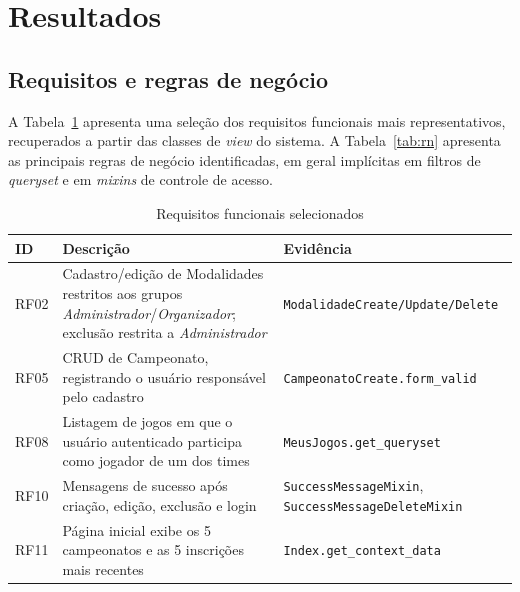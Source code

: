 \documentclass[12pt]{article}
\begin{document}
\section{Resultados}
\label{sec:resultados}

\subsection{Requisitos e regras de negócio}

A Tabela~\ref{tab:rf} apresenta uma seleção dos requisitos funcionais mais
representativos, recuperados a partir das classes de \emph{view} do sistema.
A Tabela~\ref{tab:rn} apresenta as principais regras de negócio
identificadas, em geral implícitas em filtros de \emph{queryset} e em
\emph{mixins} de controle de acesso.

\begin{table}[ht]
\centering
\caption{Requisitos funcionais selecionados}
\label{tab:rf}
\small
\begin{tabular}{@{}p{0.9cm}p{6.6cm}p{4.6cm}@{}}
\toprule
\textbf{ID} & \textbf{Descrição} & \textbf{Evidência} \\
\midrule
RF02 & Cadastro/edição de Modalidades restritos aos grupos \emph{Administrador}/\emph{Organizador}; exclusão restrita a \emph{Administrador} & \texttt{ModalidadeCreate/Update/Delete} \\
RF05 & CRUD de Campeonato, registrando o usuário responsável pelo cadastro & \texttt{CampeonatoCreate.form\_valid} \\
RF08 & Listagem de jogos em que o usuário autenticado participa como jogador de um dos times & \texttt{MeusJogos.get\_queryset} \\
RF10 & Mensagens de sucesso após criação, edição, exclusão e login & \texttt{SuccessMessageMixin}, \texttt{SuccessMessageDeleteMixin} \\
RF11 & Página inicial exibe os 5 campeonatos e as 5 inscrições mais recentes & \texttt{Index.get\_context\_data} \\
\bottomrule
\end{tabular}
\end{table}
\end{document}
